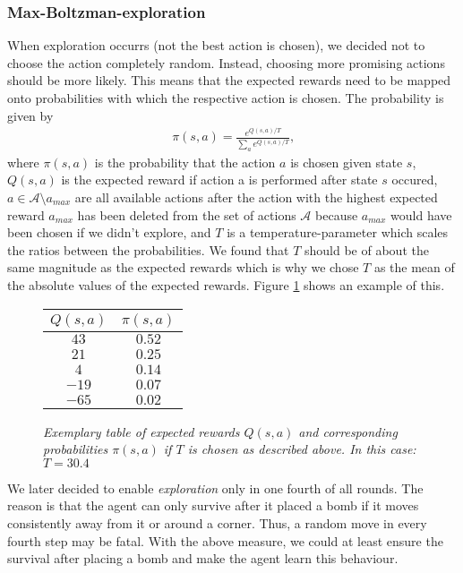	\subsubsection{Max-Boltzman-exploration}
	When exploration occurrs (not the best action is chosen), we decided not to choose the action completely random. Instead, choosing more promising actions should be more likely. This means that the expected rewards need to be mapped onto probabilities with which the respective action is chosen. The probability is given by 
	\begin{align}
		\pi (s,a) = \frac{e^{Q(s,a)/T}}{\sum_{a} e^{Q(s,a)/T}}\text{,}
	\end{align}
	where $\pi (s,a)$ is the probability that the action $a$ is chosen given state $s$, $Q(s,a)$ is the expected reward if action a is performed after state $s$ occured, $a \in \mathcal{A}\setminus a_{max}$ are all available actions after the action with the highest expected reward $a_{max}$ has been deleted from the set of actions $\mathcal{A}$ because $a_{max}$ would have been chosen if we didn't explore, and $T$ is a temperature-parameter which scales the ratios between the probabilities. We found that $T$ should be of about the same magnitude as the expected rewards which is why we chose $T$ as the mean of the absolute values of the expected rewards. Figure \ref{MB_table} shows an example of this.
	\begin{figure}[h]
		\centering
		\begin{tabular}{c|c}
			$Q(s,a)$ & $\pi (s,a)$\\
			\midrule
			$43$ & $0.52$\\
			$21$ & $0.25$\\
			$4$ & $0.14$\\
			$-19$ & $0.07$\\
			$-65$ & $0.02$
		\end{tabular}
	\caption{\textit{Exemplary table of expected rewards $Q(s,a)$ and corresponding probabilities $\pi (s,a)$ if $T$ is chosen as described above. In this case: $T=30.4$}}
	\label{MB_table}
	\end{figure}
	We later decided to enable \textit{exploration} only in one fourth of all rounds. The reason is that the agent can only survive after it placed a bomb if it moves consistently away from it or around a corner. Thus, a random move in every fourth step may be fatal. With the above measure, we could at least ensure the survival after placing a bomb and make the agent learn this behaviour.
	
